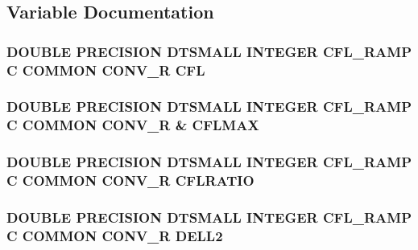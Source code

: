 \subsection{Variable Documentation}
\hypertarget{conv_8com_abba4cd7448a713602f433783798bc49f}{
\subsubsection[{C\-F\-L}]{\setlength{\rightskip}{0pt plus 5cm}D\-O\-U\-B\-L\-E P\-R\-E\-C\-I\-S\-I\-O\-N D\-T\-S\-M\-A\-L\-L I\-N\-T\-E\-G\-E\-R C\-F\-L\-\_\-\-R\-A\-M\-P C C\-O\-M\-M\-O\-N C\-O\-N\-V\-\_\-\-R C\-F\-L}}\label{conv_8com_abba4cd7448a713602f433783798bc49f}
\hypertarget{conv_8com_acefea3b10cf227cfbe18a5ae682cda07}{
\subsubsection[{C\-F\-L\-M\-A\-X}]{\setlength{\rightskip}{0pt plus 5cm}D\-O\-U\-B\-L\-E P\-R\-E\-C\-I\-S\-I\-O\-N D\-T\-S\-M\-A\-L\-L I\-N\-T\-E\-G\-E\-R C\-F\-L\-\_\-\-R\-A\-M\-P C C\-O\-M\-M\-O\-N C\-O\-N\-V\-\_\-\-R \& C\-F\-L\-M\-A\-X}}\label{conv_8com_acefea3b10cf227cfbe18a5ae682cda07}
\hypertarget{conv_8com_afddb47408d5e35303a408fd28821caa1}{
\subsubsection[{C\-F\-L\-R\-A\-T\-I\-O}]{\setlength{\rightskip}{0pt plus 5cm}D\-O\-U\-B\-L\-E P\-R\-E\-C\-I\-S\-I\-O\-N D\-T\-S\-M\-A\-L\-L I\-N\-T\-E\-G\-E\-R C\-F\-L\-\_\-\-R\-A\-M\-P C C\-O\-M\-M\-O\-N C\-O\-N\-V\-\_\-\-R C\-F\-L\-R\-A\-T\-I\-O}}\label{conv_8com_afddb47408d5e35303a408fd28821caa1}
\hypertarget{conv_8com_a95e10880467f92be3f5430f2d2ac274b}{
\subsubsection[{D\-E\-L\-L2}]{\setlength{\rightskip}{0pt plus 5cm}D\-O\-U\-B\-L\-E P\-R\-E\-C\-I\-S\-I\-O\-N D\-T\-S\-M\-A\-L\-L I\-N\-T\-E\-G\-E\-R C\-F\-L\-\_\-\-R\-A\-M\-P C C\-O\-M\-M\-O\-N C\-O\-N\-V\-\_\-\-R D\-E\-L\-L2}}\label{conv_8com_a95e10880467f92be3f5430f2d2ac274b}
